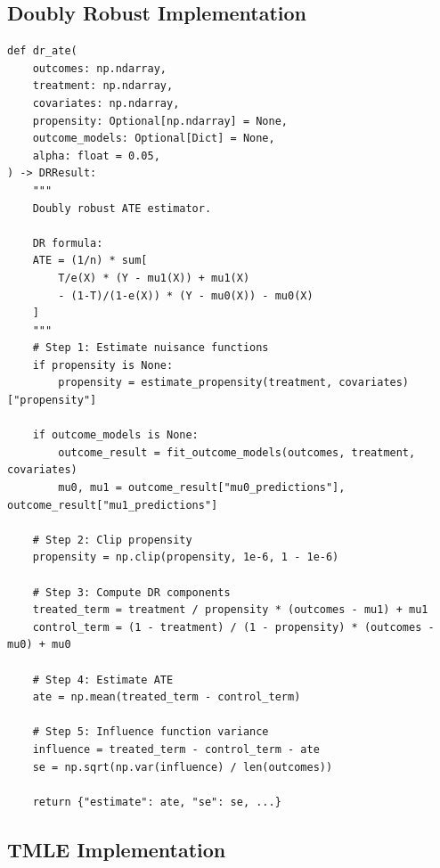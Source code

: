 \subsection{Doubly Robust Implementation}

\begin{verbatim}
def dr_ate(
    outcomes: np.ndarray,
    treatment: np.ndarray,
    covariates: np.ndarray,
    propensity: Optional[np.ndarray] = None,
    outcome_models: Optional[Dict] = None,
    alpha: float = 0.05,
) -> DRResult:
    """
    Doubly robust ATE estimator.

    DR formula:
    ATE = (1/n) * sum[
        T/e(X) * (Y - mu1(X)) + mu1(X)
        - (1-T)/(1-e(X)) * (Y - mu0(X)) - mu0(X)
    ]
    """
    # Step 1: Estimate nuisance functions
    if propensity is None:
        propensity = estimate_propensity(treatment, covariates)["propensity"]

    if outcome_models is None:
        outcome_result = fit_outcome_models(outcomes, treatment, covariates)
        mu0, mu1 = outcome_result["mu0_predictions"], outcome_result["mu1_predictions"]

    # Step 2: Clip propensity
    propensity = np.clip(propensity, 1e-6, 1 - 1e-6)

    # Step 3: Compute DR components
    treated_term = treatment / propensity * (outcomes - mu1) + mu1
    control_term = (1 - treatment) / (1 - propensity) * (outcomes - mu0) + mu0

    # Step 4: Estimate ATE
    ate = np.mean(treated_term - control_term)

    # Step 5: Influence function variance
    influence = treated_term - control_term - ate
    se = np.sqrt(np.var(influence) / len(outcomes))

    return {"estimate": ate, "se": se, ...}
\end{verbatim}

\subsection{TMLE Implementation}

